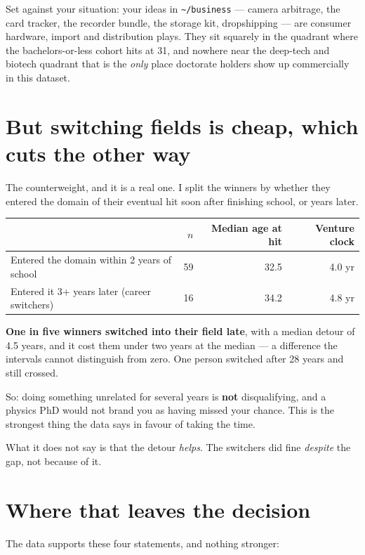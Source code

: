 \documentclass[11pt]{article}
\begin{document}
Set against your situation: your ideas in \texttt{\textasciitilde/business} ---
camera arbitrage, the card tracker, the recorder bundle, the storage kit,
dropshipping --- are consumer hardware, import and distribution plays. They sit
squarely in the quadrant where the bachelors-or-less cohort hits at 31, and
nowhere near the deep-tech and biotech quadrant that is the \emph{only} place
doctorate holders show up commercially in this dataset.

\section{But switching fields is cheap, which cuts the other way}

The counterweight, and it is a real one. I split the winners by whether they
entered the domain of their eventual hit soon after finishing school, or years
later.

\begin{table}[h]
\centering
\begin{tabular}{lrrr}
\toprule
& $n$ & Median age at hit & Venture clock \\
\midrule
Entered the domain within 2 years of school & 59 & 32.5 & 4.0 yr \\
Entered it 3+ years later (career switchers) & 16 & 34.2 & 4.8 yr \\
\bottomrule
\end{tabular}
\end{table}

\textbf{One in five winners switched into their field late}, with a median
detour of 4.5 years, and it cost them under two years at the median --- a
difference the intervals cannot distinguish from zero. One person switched after
28 years and still crossed.

So: doing something unrelated for several years is \textbf{not} disqualifying,
and a physics PhD would not brand you as having missed your chance. This is the
strongest thing the data says in favour of taking the time.

What it does not say is that the detour \emph{helps}. The switchers did fine
\emph{despite} the gap, not because of it.

\section{Where that leaves the decision}

The data supports these four statements, and nothing stronger:
\end{document}
